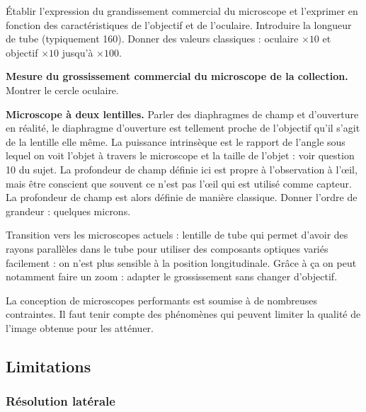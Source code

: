 Établir l'expression du grandissement commercial du microscope et l'exprimer en fonction des caractéristiques de l'objectif et de l'oculaire.
Introduire la longueur de tube (typiquement \unit{160}{\milli\meter}).
Donner des valeurs classiques : oculaire $\times 10$ et objectif $\times 10$ jusqu'à $\times 100$.

\begin{experience}
\textbf{Mesure du grossissement commercial du microscope de la collection.}
Montrer le cercle oculaire.
\end{experience}

\begin{slide}
\textbf{Microscope à deux lentilles.}
Parler des diaphragmes de champ et d'ouverture en réalité, le diaphragme d'ouverture est tellement proche de l'objectif qu'il s'agit de la lentille elle même.
La puissance intrinsèque est le rapport de l'angle sous lequel on voit l'objet à travers le microscope et la taille de l'objet : voir question 10 du sujet.
La profondeur de champ définie ici est propre à l'observation à l'œil, mais être conscient que souvent ce n'est pas l'œil qui est utilisé comme capteur.
La profondeur de champ est alors définie de manière classique.
Donner l'ordre de grandeur : quelques microns.
\end{slide}

\begin{remarque}
Transition vers les microscopes actuels : lentille de tube qui permet d'avoir des rayons parallèles dans le tube pour utiliser des composants optiques variés facilement : on n'est plus sensible à la position longitudinale.
Grâce à ça on peut notamment faire un zoom : adapter le grossissement sans changer d'objectif.
\end{remarque}

\begin{transition}
La conception de microscopes performants est soumise à de nombreuses contraintes.
Il faut tenir compte des phénomènes qui peuvent limiter la qualité de l'image obtenue pour les atténuer.
\end{transition}

\subsection{Limitations}

\subsubsection{Résolution latérale}


